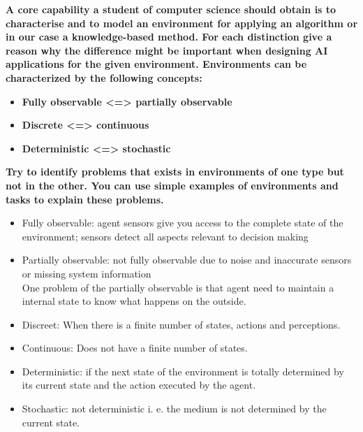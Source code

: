 \documentclass[paper=a4, fontsize=11pt]{scrartcl} %
\numberwithin{equation}{section} %
\numberwithin{figure}{section} %
\numberwithin{table}{section} %
\begin{document}
\large{ \textbf{A core capability a student of computer science should obtain is to characterise 
and to model an environment for applying an algorithm or in our case a knowledge-based method.
For each distinction give a reason why the difference might be important when designing AI applications for the given environment.
Environments can be characterized by the following concepts:}

	\begin{itemize}
		\item \large{ \textbf{Fully observable <=> partially observable}}
	 	\item \large{ \textbf{Discrete <=> continuous}}
	 	\item \large{ \textbf{Deterministic <=> stochastic}}
	\end{itemize}

\large{ \textbf{Try to identify problems that exists in environments of one type but not in the other. You can use simple examples of environments and tasks to explain these problems.}}
\newline

\begin{itemize}
\item Fully observable: agent sensors give you access to the complete state of the environment; sensors detect all aspects relevant to decision making \\
\item Partially observable: not fully observable due to noise and inaccurate sensors or missing system information \\

One problem of the partially observable is that agent need to maintain a internal state to know what happens on the outside.\\

\item Discreet: When there is a finite number of states, actions and perceptions.\\
\item Continuous: Does not have a finite number of states.\\


\item Deterministic: if the next state of the environment is totally determined by its current state and the action executed by the agent. \\      
\item Stochastic: not deterministic i. e. the medium is not determined by the current state. \\
\end{itemize}
\newpage



}
\end{document}

